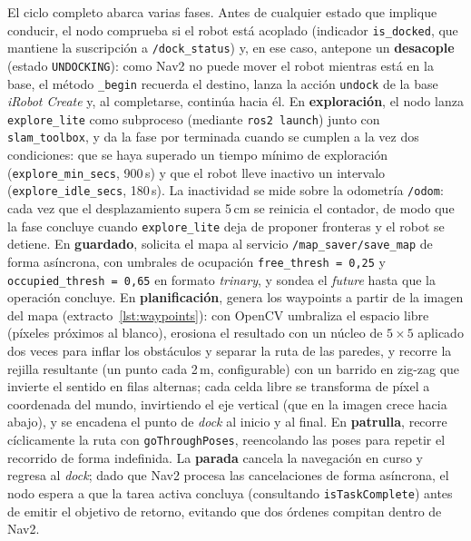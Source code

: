 El ciclo completo abarca varias fases. Antes de cualquier estado que implique
conducir, el nodo comprueba si el robot está acoplado (indicador \texttt{is\_docked},
que mantiene la suscripción a \texttt{/dock\_status}) y, en ese caso, antepone un
\textbf{desacople} (estado \texttt{UNDOCKING}): como Nav2 no puede mover el robot
mientras está en la base, el método \texttt{\_begin} recuerda el destino, lanza la
acción \texttt{undock} de la base \textit{iRobot Create} y, al completarse, continúa
hacia él. En \textbf{exploración}, el nodo lanza
\texttt{explore\_lite} como subproceso (mediante \texttt{ros2 launch}) junto con
\texttt{slam\_toolbox}, y da la fase por terminada cuando se cumplen a la vez dos
condiciones: que se haya superado un tiempo mínimo de exploración
(\texttt{explore\_min\_secs}, 900\,s) y que el robot lleve inactivo un intervalo
(\texttt{explore\_idle\_secs}, 180\,s). La inactividad se mide sobre la odometría
\texttt{/odom}: cada vez que el desplazamiento supera 5\,cm se reinicia el contador,
de modo que la fase concluye cuando \texttt{explore\_lite} deja de proponer fronteras
y el robot se detiene. En \textbf{guardado}, solicita el mapa al servicio
\texttt{/map\_saver/save\_map} de forma asíncrona, con umbrales de ocupación
\texttt{free\_thresh = 0,25} y \texttt{occupied\_thresh = 0,65} en formato
\textit{trinary}, y sondea el \textit{future} hasta que la operación concluye. En
\textbf{planificación}, genera los waypoints a partir de la imagen del mapa
(extracto~\ref{lst:waypoints}): con OpenCV umbraliza el espacio libre (píxeles
próximos al blanco), erosiona el resultado con un núcleo de $5\times5$ aplicado dos
veces para inflar los obstáculos y separar la ruta de las paredes, y recorre la
rejilla resultante (un punto cada 2\,m, configurable) con un barrido en zig-zag que
invierte el sentido en filas alternas; cada celda libre se transforma de píxel a
coordenada del mundo, invirtiendo el eje vertical (que en la imagen crece hacia
abajo), y se encadena el punto de \textit{dock} al inicio y al final. En
\textbf{patrulla}, recorre cíclicamente la ruta con \texttt{goThroughPoses},
reencolando las poses para repetir el recorrido de forma indefinida. La
\textbf{parada} cancela la navegación en curso y regresa al \textit{dock}; dado que
Nav2 procesa las cancelaciones de forma asíncrona, el nodo espera a que la tarea
activa concluya (consultando \texttt{isTaskComplete}) antes de emitir el objetivo de
retorno, evitando que dos órdenes compitan dentro de Nav2. 

